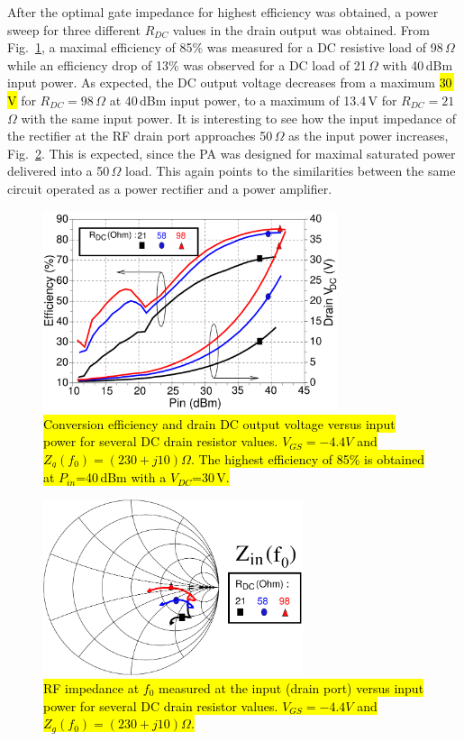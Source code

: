 After the optimal gate impedance for highest efficiency was obtained, a power sweep for three different $R_{DC}$ values in the drain output was obtained. From Fig.~\ref{Rd_sweep_final}, a maximal efficiency of 85\% was measured for a DC resistive load of 98\,$\Omega$ while an efficiency drop of 13\% was observed for a DC load of 21\,$\Omega$ with 40\,dBm input power. As expected, the DC output voltage decreases from a maximum \hl{30\,V} for $R_{DC}=98$\,$\Omega$ at 40\,dBm input power, to a maximum of 13.4\,V for $R_{DC}=21$\,$\Omega$ with the same input power. It is interesting to see how the input impedance of the rectifier at the RF drain port approaches 50\,$\Omega$ as the input power increases, Fig.~\ref{Rd_sweep_Zin}. This is expected, since the PA was designed for maximal saturated power delivered into a 50\,$\Omega$ load. This again points to the similarities between the same circuit operated as a power rectifier and a power amplifier.

\begin{figure}[ht!]
\centering
\includegraphics[width=3.4in]{pdf/13.pdf}
\caption{\hl{Conversion efficiency and drain DC output voltage versus input power for several DC drain resistor values. $V_{GS}=-4.4V$ and $Z_g(f_0)=\left(230+j10\right)\Omega$. The highest efficiency of 85\% is obtained at $P_{in}$=40\,dBm with a $V_{DC}$=30\,V.}}
\label{Rd_sweep_final}
\end{figure}


\begin{figure}[ht!]
\centering
\includegraphics[width=3in]{pdf/14.pdf}
\caption{\hl{RF impedance at $f_0$ measured at the input (drain port) versus input power for several DC drain resistor values. $V_{GS}=-4.4V$ and $Z_g(f_0)=\left(230+j10\right)\Omega$.}}
\label{Rd_sweep_Zin}
\end{figure}




